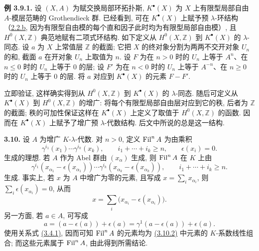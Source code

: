 \textbf{例 3.9.1.} 设 \((X,A)\) 为赋交换局部环拓扑斯, \(K^{\bullet}(X)\) 为 \(X\) 上有限型局部自由 \(A\)-模层范畴的 Grothendieck 群. 已经看到, 可在 \(K^{\bullet}(X)\) 上赋予预 \(\lambda\)-环结构（\hyperlink{sga6.e05.ex.2-2}{2.2.b}, 因为有限型自由模的每个直和因子此时均为有限型局部自由模）, 且 \(H^0(X,\mathbb Z)\) 典范地赋有二项式环结构. 如下定义从 \(H^0(X,\mathbb Z)\) 到 \(K^{\bullet}(X)\) 的 \(\lambda\)-同态. 设 \(a\) 为 \(X\) 上常值层 \(\mathbb Z\) 的截面; 它把 \(X\) 的终对象分割为两两不交开对象 \(U_n\) 的和, 截面 \(a\) 在开对象 \(U_n\) 上取值为 \(n\). 设 \(F\) 为在 \(n>0\) 时的 \(U_n\) 上等于 \(A^n\)、在 \(n\le0\) 时的 \(U_n\) 上等于 \(0\) 的层; 设 \(F'\) 为在 \(n<0\) 时的 \(U_n\) 上等于 \(A^{-n}\)、在 \(n\ge0\) 时的 \(U_n\) 上等于 \(0\) 的层. 将 \(a\) 对应到 \(K^{\bullet}(X)\) 的元素 \(F-F'\).

立即验证, 这样确实得到从 \(H^0(X,\mathbb Z)\) 到 \(K^{\bullet}(X)\) 的 \(\lambda\)-同态. 随后可定义从 \(K^{\bullet}(X)\) 到 \(H^0(X,\mathbb Z)\) 的增广: 将每个有限型局部自由层对应到它的秩, 后者为 \(\mathbb Z\) 的截面; 秩的可加性保证这样在 \(K^{\bullet}(X)\) 上定义了取值于 \(H^0(X,\mathbb Z)\) 的函数. 因而在 \(K^{\bullet}(X)\) 上赋予了增广预 \(\lambda\)-代数结构. 后文中所说的总是这一结构.

\textbf{3.10.} 设 \(A\) 为增广 \(K\)-\(\lambda\)-代数. 对 \(n>0\), 定义 \(\operatorname{Fil}^n A\) 为由乘积
\begin{equation}\tag{3.10.1}
  \gamma^{i_1}(x_1)\cdots\gamma^{i_k}(x_k),
  \qquad i_1+\cdots+i_k\ge n,
  \qquad \epsilon(x_i)=0.
\end{equation}
生成的理想. 若 \(A\) 作为 Abel 群由 \((x_\alpha)\) 生成, 则 \(\operatorname{Fil}^nA\) 在 \(K\) 上由
\begin{equation}\tag{3.10.2}
  \gamma^{i_1}(x_{\alpha_1}-\epsilon(x_{\alpha_1}))\cdots
  \gamma^{i_k}(x_{\alpha_k}-\epsilon(x_{\alpha_k})),
  \qquad i_1+\cdots+i_k\ge n.
\end{equation}
生成. 事实上, 若 \(x\) 为 \(A\) 中增广为零的元素, 且写成 \(x=\sum_i x_{\alpha_i}\), 则 \(\sum_i\epsilon(x_{\alpha_i})=0\), 从而
\[
 x=\sum_i\bigl(x_{\alpha_i}-\epsilon(x_{\alpha_i})\bigr).
\]
另一方面, 若 \(a\in A\), 可写成
\[
 a=(a-\epsilon(a))+\epsilon(a)
   =\gamma^1(a-\epsilon(a))+\epsilon(a).
\]
使用关系式 \hyperlink{sga6.e05.eq.3-4-1}{(3.4.1)}, 因而可知 \(\operatorname{Fil}^nA\) 的元素均为 \hyperlink{sga6.e05.eq.3-10-2}{(3.10.2)} 中元素的 \(K\)-系数线性组合; 而这些元素属于 \(\operatorname{Fil}^nA\), 由此得到所需结论.

